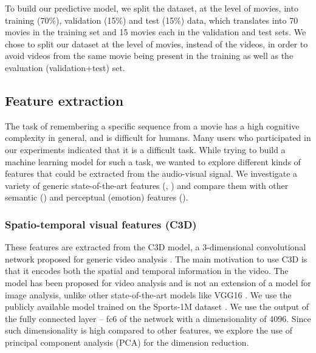 \documentclass[sigconf]{acmart}
\begin{document}
To build our predictive model, we split the dataset, at the level of movies, into training (70\%), validation (15\%) and test (15\%) data, which translates into 70 movies in the training set and 15 movies each in the validation and test sets.
We chose to split our dataset at the level of movies, instead of the videos, in order to avoid videos from the same movie being present in the training as well as the evaluation (validation+test) set.

\subsection{Feature extraction}
\label{feat-extr}
The task of remembering a specific sequence from a movie has a high cognitive complexity in general, and is difficult for humans.
Many users who participated in our experiments indicated that it is a difficult task.
While trying to build a machine learning model for such a task, we wanted to explore different kinds of features that could be extracted from the audio-visual signal.
We investigate a variety of generic state-of-the-art features (\cite{c3d-feat}, \cite{audioset-feat}) and compare them with other semantic (\cite{caption-feat}) and perceptual (emotion) features (\cite{sb-feat}).


\subsubsection{Spatio-temporal visual features (C3D)}
\label{c3d-feat}
These features are extracted from the C3D model, a 3-dimensional convolutional network proposed for generic video analysis \cite{c3d-feat}. 
The main motivation to use C3D is that it encodes both the spatial and temporal information in the video.
The model has been proposed for video analysis and is not an extension of a model for image analysis, unlike other state-of-the-art models like VGG16 \cite{vgg16}.
We use the publicly available model trained on the Sports-1M dataset \cite{c3d-feat}.
We use the output of the fully connected layer -- fc6 of the network with a dimensionality of 4096.
Since such dimensionality is high compared to other features, we explore the use of principal component analysis (PCA) for the dimension reduction.
\end{document}
